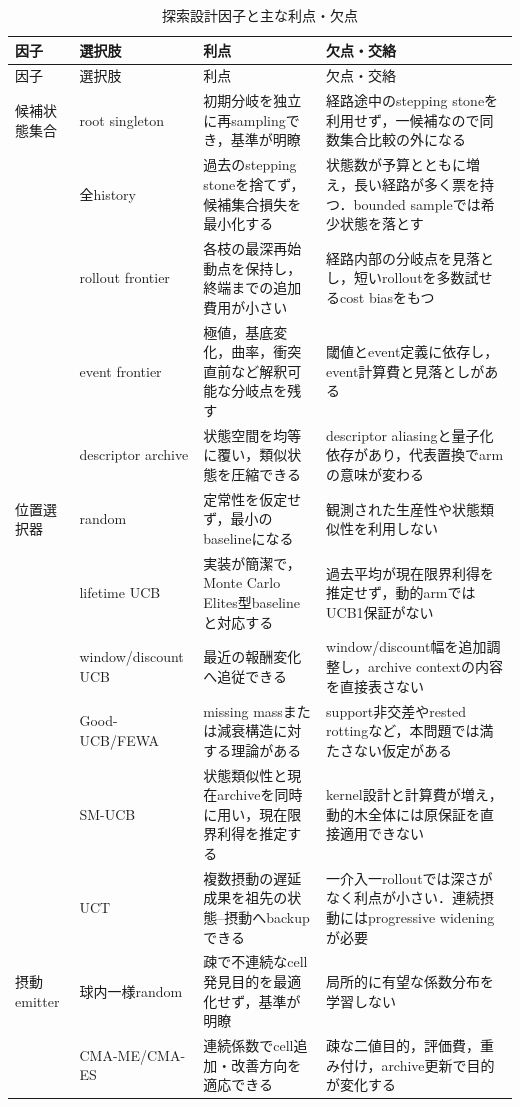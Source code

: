 \documentclass[a4paper,11pt]{ltjsarticle}
\begin{document}
\small
\begin{longtable}{p{19mm}p{29mm}p{46mm}p{46mm}}
\caption{探索設計因子と主な利点・欠点}\label{tab:factors}\\
\toprule
因子 & 選択肢 & 利点 & 欠点・交絡\\
\midrule
\endfirsthead
\toprule
因子 & 選択肢 & 利点 & 欠点・交絡\\
\midrule
\endhead
候補状態集合 & root singleton & 初期分岐を独立に再samplingでき，基準が明瞭 & 経路途中のstepping stoneを利用せず，一候補なので同数集合比較の外になる\\
& 全history & 過去のstepping stoneを捨てず，候補集合損失を最小化する & 状態数が予算とともに増え，長い経路が多く票を持つ．bounded sampleでは希少状態を落とす\\
& rollout frontier & 各枝の最深再始動点を保持し，終端までの追加費用が小さい & 経路内部の分岐点を見落とし，短いrolloutを多数試せるcost biasをもつ\\
& event frontier & 極値，基底変化，曲率，衝突直前など解釈可能な分岐点を残す & 閾値とevent定義に依存し，event計算費と見落としがある\\
& descriptor archive & 状態空間を均等に覆い，類似状態を圧縮できる & descriptor aliasingと量子化依存があり，代表置換でarmの意味が変わる\\
\midrule
位置選択器 & random & 定常性を仮定せず，最小のbaselineになる & 観測された生産性や状態類似性を利用しない\\
& lifetime UCB & 実装が簡潔で，Monte Carlo Elites型baselineと対応する & 過去平均が現在限界利得を推定せず，動的armではUCB1保証がない\\
& window/discount UCB & 最近の報酬変化へ追従できる & window/discount幅を追加調整し，archive contextの内容を直接表さない\\
& Good-UCB/FEWA & missing massまたは減衰構造に対する理論がある & support非交差やrested rottingなど，本問題では満たさない仮定がある\\
& SM-UCB & 状態類似性と現在archiveを同時に用い，現在限界利得を推定する & kernel設計と計算費が増え，動的木全体には原保証を直接適用できない\\
& UCT & 複数摂動の遅延成果を祖先の状態--摂動へbackupできる & 一介入一rolloutでは深さがなく利点が小さい．連続摂動にはprogressive wideningが必要\\
\midrule
摂動emitter & 球内一様random & 疎で不連続なcell発見目的を最適化せず，基準が明瞭 & 局所的に有望な係数分布を学習しない\\
& CMA-ME/CMA-ES & 連続係数でcell追加・改善方向を適応できる & 疎な二値目的，評価費，重み付け，archive更新で目的が変化する\\

\end{longtable}
\end{document}
